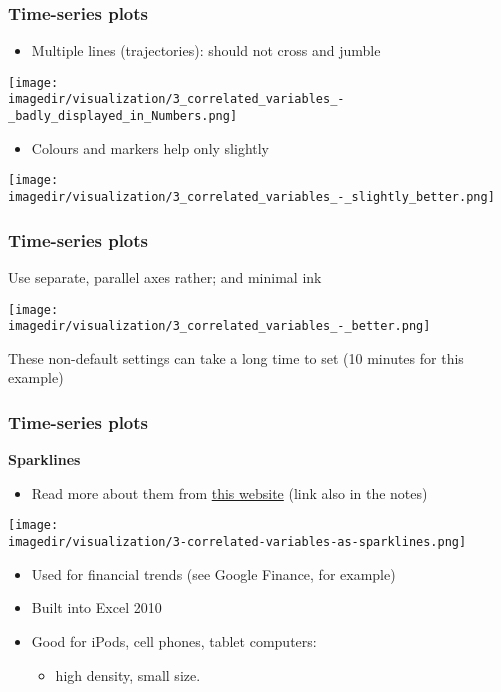 \begin{frame}\frametitle{Time-series plots}
	\begin{itemize}
		\item	Multiple lines (trajectories): should not cross and jumble 
	\end{itemize}
	\begin{center}
		\texttt{[image: \\imagedir/visualization/3\_correlated\_variables\_-\_badly\_displayed\_in\_Numbers.png]}
	\end{center}
	\begin{itemize}
		\item	Colours and markers help only slightly 
	\end{itemize}
	\begin{center}
		\texttt{[image: \\imagedir/visualization/3\_correlated\_variables\_-\_slightly\_better.png]}
	\end{center}
\end{frame}

\begin{frame}\frametitle{Time-series plots}
	Use separate, parallel axes rather; and minimal ink 
	\begin{center}
		\texttt{[image: \\imagedir/visualization/3\_correlated\_variables\_-\_better.png]}
	\end{center}
	These non-default settings can take a long time to set (10 minutes for this example)
\end{frame}

\begin{frame}\frametitle{Time-series plots}
	\textbf{Sparklines}
	\begin{itemize}
		\item	Read more about them from \href{http://www.edwardtufte.com/bboard/q-and-a-fetch-msg?msg_id=0001OR}{this website} (link also in the notes) 
	\end{itemize}
	\begin{center}
		\texttt{[image: \\imagedir/visualization/3-correlated-variables-as-sparklines.png]}
	\end{center}
	\begin{itemize}
		\item	Used for financial trends (see Google Finance, for example) 
		\item	Built into Excel 2010 
		\item	Good for iPods, cell phones, tablet computers: 
		\begin{itemize}
			\item	high density, small size. 
		\end{itemize}
	\end{itemize}
\end{frame}

